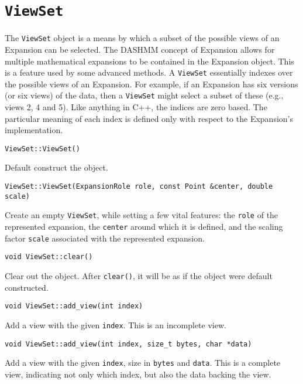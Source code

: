 \section{\texttt{ViewSet}}

The \texttt{ViewSet} object is a means by which a subset of the possible views
of an Expansion can be selected. The DASHMM concept of Expansion allows for
multiple mathematical expansions to be contained in the Expansion object. This
is a feature used by some advanced methods. A \texttt{ViewSet} essentially
indexes over the possible views of an Expansion. For example, if an
Expansion has six versions (or six views) of the data, then a \texttt{ViewSet}
might select a subset of these (e.g., views 2, 4 and 5). Like anything in C++,
the indices are zero based. The particular meaning of each index is defined
only with respect to the Expansion's implementation.

\begin{lstlisting}
ViewSet::ViewSet()
\end{lstlisting}


Default construct the object.

\begin{lstlisting}
ViewSet::ViewSet(ExpansionRole role, const Point &center, double scale)
\end{lstlisting}

Create an empty \texttt{ViewSet}, while setting a few vital features: the
\texttt{role} of the represented expansion, the \texttt{center} around which it
is defined, and the scaling factor \texttt{scale} associated with the
represented expansion.

\begin{lstlisting}
void ViewSet::clear()
\end{lstlisting}


Clear out the object. After \texttt{clear()}, it will be as if the object
were default constructed.

\begin{lstlisting}
void ViewSet::add_view(int index)
\end{lstlisting}


Add a view with the given \texttt{index}. This is an incomplete view.

\begin{lstlisting}
void ViewSet::add_view(int index, size_t bytes, char *data)
\end{lstlisting}


Add a view with the given \texttt{index}, size in \texttt{bytes} and
\texttt{data}. This is a complete view, indicating not only which index, but
also the data backing the view.

